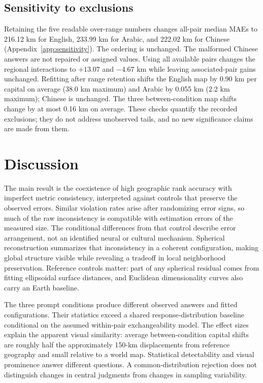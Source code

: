 \documentclass[12pt,a4paper]{article}
\begin{document}
\subsection{Sensitivity to exclusions}
Retaining the five readable over-range numbers changes all-pair median MAEs to 216.12 km for English, 233.99 km for Arabic, and 222.02 km for Chinese (Appendix~\ref{app:sensitivity}). The ordering is unchanged. The malformed Chinese answers are not repaired or assigned values. Using all available pairs changes the regional interactions to $+13.07$ and $-4.67$ km while leaving associated-pair gains unchanged. Refitting after range retention shifts the English map by 0.90 km per capital on average (38.0 km maximum) and Arabic by 0.055 km (2.2 km maximum); Chinese is unchanged. The three between-condition map shifts change by at most 0.16 km on average. These checks quantify the recorded exclusions; they do not address unobserved tails, and no new significance claims are made from them.

\section{Discussion}
The main result is the coexistence of high geographic rank accuracy with imperfect metric consistency, interpreted against controls that preserve the observed errors. Similar violation rates arise after randomizing error signs, so much of the raw inconsistency is compatible with estimation errors of the measured size. The conditional differences from that control describe error arrangement, not an identified neural or cultural mechanism. Spherical reconstruction summarizes that inconsistency in a coherent configuration, making global structure visible while revealing a tradeoff in local neighborhood preservation. Reference controls matter: part of any spherical residual comes from fitting ellipsoidal surface distances, and Euclidean dimensionality curves also carry an Earth baseline.

The three prompt conditions produce different observed answers and fitted configurations. Their statistics exceed a shared response-distribution baseline conditional on the assumed within-pair exchangeability model. The effect sizes explain the apparent visual similarity: average between-condition capital shifts are roughly half the approximately 150-km displacements from reference geography and small relative to a world map. Statistical detectability and visual prominence answer different questions. A common-distribution rejection does not distinguish changes in central judgments from changes in sampling variability.
\end{document}
